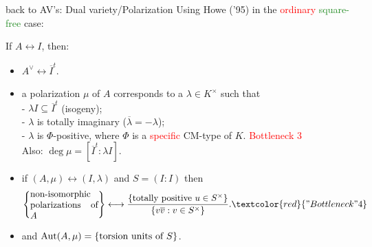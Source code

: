 \documentclass[usenames,dvipsnames]{beamer}
\newcommand{\red}[1]{\textcolor{red}{#1}}
\newcommand{\green}[1]{\textcolor{ForestGreen}{#1}}
\begin{document}
% 

\begin{frame}{ back to AV's: Dual variety/Polarization }
Using Howe ('95) in the \red{ordinary} \green{square-free} case: 
\begin{theorem}[M.]
   If $A\leftrightarrow I$, then:
   \begin{itemize}
      \pause \item $A^\vee \leftrightarrow \overline{I}^t$.
      \pause \item a polarization $\mu$ of $A$ corresponds to a $\lambda\in K^\times$ such that\\
	    - $\lambda I \subseteq \overline{I}^t$ (isogeny);\\
	    - $\lambda$ is totally imaginary ($\overline \lambda = -\lambda$);\\
	    - $\lambda$ is $\Phi$-positive, where $\Phi$ is a \red{specific} CM-type of $K$. \red{Bottleneck 3}\\ 
      Also: $\deg \mu= [\overline{I}^t : \lambda I]$.
      \pause  \item if $(A,\mu) \leftrightarrow (I,\lambda)$ and $S=(I:I)$ then
     \vspace{-0.5em}
	      \[\set{\parbox[p]{7.5em}{non-isomorphic polarizations of $A$}} \longleftrightarrow \dfrac{\set{\text{totally positive }u\in S^\times }}{\set{v\overline{v}: v\in S^\times}}. \red{"Bottleneck" 4}\]
     \vspace{-1em}
	 \pause \item  and $\operatorname{Aut}(A,\mu) = \left\lbrace\text{torsion units of $S$}\right\rbrace$.
\end{itemize}
\end{theorem}
\end{frame}
\end{document}
